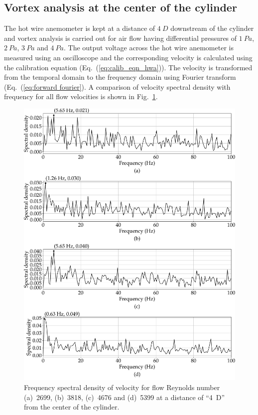 \subsection{Vortex analysis at the center of the cylinder}
The hot wire anemometer is kept at a distance of $4~D$ downstream of the cylinder and vortex analysis is carried out for air flow having differential pressures of $1~Pa$, $2~Pa$, $3~Pa$ and $4~Pa$. The output voltage across the hot wire anemometer is measured using an oscilloscope and the corresponding velocity is calculated using the calibration equation (Eq.~(\ref{eq:calib_eqn_hwa})). The velocity is transformed from the temporal domain to the frequency domain using Fourier transform (Eq.~(\ref{eq:forward fourier}).  A comparison of velocity spectral density with frequency for all flow velocities is shown in Fig.~\ref{fig:surface_x_4D_y_0}. 
\begin{figure}
    \centering
    \includegraphics[width=\linewidth]{gfx/FFT_all_freq_x_4D_y_0.pdf}
    \caption{Frequency spectral density of velocity for flow Reynolds number (a)~2699, (b)~3818, (c)~4676 and (d)~5399 at a distance of \enquote{4~D} from the center of the cylinder.}
    \label{fig:surface_x_4D_y_0}
\end{figure}
